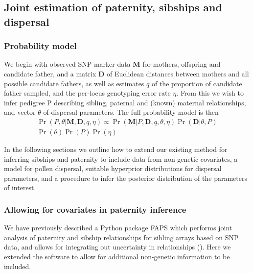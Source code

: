 \documentclass[10pt, a4paper, twocolumn]{article} %
\begin{document}
\subsection{Joint estimation of paternity, sibships and dispersal}

\subsubsection{Probability model}

We begin with observed SNP marker data \textbf{M} for mothers, offspring and candidate father, and a matrix \textbf{D} of Euclidean distances between mothers and all possible candidate fathers, as well as estimates $q$ of the proportion of candidate father sampled, and the per-locus genotyping error rate $\eta$. From this we wish to infer pedigree P describing sibling, paternal and (known) maternal relationships, and vector $\theta$ of dispersal parameters. The full probability model is then
\begin{equation}
\label{eqn:probability_model}
\begin{split}
\Pr( P, \theta | \textbf{M}, \textbf{D}, q, \eta) \propto \Pr(\textbf{M} | P, \textbf{D}, q,\theta, \eta)
\Pr(\textbf{D} | \theta, P) \\
\Pr(\theta) \Pr(P) \Pr(\eta)
\end{split}
\end{equation}

In the following sections we outline how to extend our existing method for inferring sibships and paternity to include data from non-genetic covariates, a model for pollen dispersal, suitable hyperprior distributions for dispersal parameters, and a procedure to infer the posterior distribution of the parameters of interest.

\subsubsection{Allowing for covariates in paternity inference}

We have previously described a Python package FAPS which performs joint analysis of paternity and sibship relationships for sibling arrays based on SNP data, and allows for integrating out uncertainty in relationships (\cite{ellis2018efficient}). Here we extended the software to allow for additional non-genetic information to be included.
\end{document}
